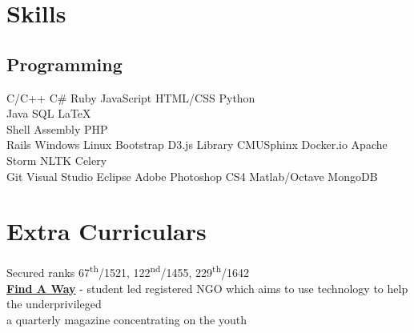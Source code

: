 \documentclass[]{deedy-resume-openfont}
\begin{document}
\begin{minipage}[t]{0.33\textwidth}
\section{Skills}
\subsection{Programming}
C/C++ \textbullet{}   C\# \textbullet{} Ruby \textbullet{} JavaScript \textbullet{} HTML/CSS \textbullet{} Python\\ 
Java \textbullet{} SQL \textbullet{} \LaTeX\ \\
Shell \textbullet{} Assembly  \textbullet{} PHP\\
Rails \textbullet{} Windows \textbullet{} Linux \textbullet{} Bootstrap \textbullet{} D3.js Library \textbullet{} CMUSphinx \textbullet{} Docker.io \textbullet{} Apache Storm \textbullet{} NLTK \textbullet{} Celery \\
Git \textbullet{} Visual Studio \textbullet{} Eclipse \textbullet{} Adobe Photoshop CS4 \textbullet{} Matlab/Octave \textbullet{} MongoDB
\sectionsep


\section{Extra Curriculars}
 Secured ranks 67\textsuperscript{th}/1521, 122\textsuperscript{nd}/1455, 229\textsuperscript{th}/1642\\\vspace{6pt}
\vspace{6pt}
 \textbf{\href{http://findaway.in/}{Find A Way}} - student led registered NGO which aims to use technology to help the underprivileged\\\vspace{6pt}
 a quarterly magazine concentrating on the youth



%
%

\end{minipage} 
\end{document}
